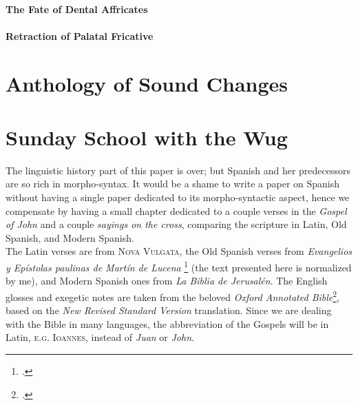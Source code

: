 \documentclass{report}[12pt]
\begin{document}
\begin{tcolorbox}
  
\end{tcolorbox}

\subsubsection*{The Fate of Dental Affricates}

\begin{tcolorbox}

\end{tcolorbox}

\subsubsection*{Retraction of Palatal Fricative}

\begin{tcolorbox}
  
\end{tcolorbox}

\chapter{Anthology of Sound Changes}

\chapter{Sunday School with the Wug}

The linguistic history part of this paper is over; but Spanish and her predecessors are so rich in morpho-syntax. It would be a shame to write a paper on Spanish without having a single paper dedicated to its morpho-syntactic aspect, hence we compensate by having a small chapter dedicated to a couple verses in the \emph{Gospel of John} and a couple \emph{sayings on the cross}, comparing the scripture in Latin, Old Spanish, and Modern Spanish. \\
The Latin verses are from \textsc{Nova Vulgata}, the Old Spanish verses from \emph{Evangelios y Epístolas paulinas de Mart\'{i}n de Lucena} \footcite{osp_nt} (the text presented here is normalized by me), and Modern Spanish ones from \emph{La Biblia de Jerusal\'{e}n}. The English glosses and exegetic notes are taken from the beloved \emph{Oxford Annotated Bible}\footcite{oab}, based on the \emph{New Revised Standard Version} translation. Since we are dealing with the Bible in many languages, the abbreviation of the Gospels will be in Latin, \textsc{e.g.} \textsc{Ioannes}, instead of \emph{Juan} or \emph{John}.
\end{document}
